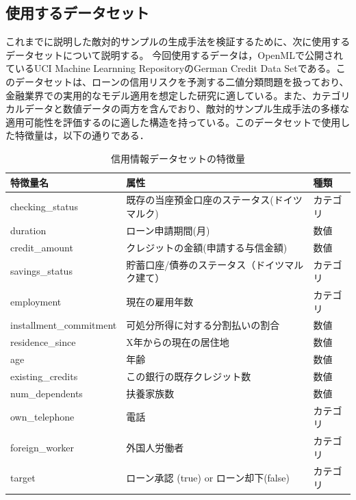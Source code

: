\subsection{使用するデータセット}
これまでに説明した敵対的サンプルの生成手法を検証するために、次に使用するデータセットについて説明する。
今回使用するデータは，OpenMLで公開されているUCI Machine Learnning RepositoryのGerman Credit Data Setである。\cite{credit-g}このデータセットは、ローンの信用リスクを予測する二値分類問題を扱っており、金融業界での実用的なモデル適用を想定した研究に適している。また、カテゴリカルデータと数値データの両方を含んでおり、敵対的サンプル生成手法の多様な適用可能性を評価するのに適した構造を持っている。このデータセットで使用した特徴量は，以下の通りである．

\begin{table}[H]
    \centering
    \caption{信用情報データセットの特徴量}
    \begin{tabular}{|l|l|l|}
        \hline
        特徴量名 & 属性 & 種類 \\ \hline
        checking\_status & 既存の当座預金口座のステータス(ドイツマルク) & カテゴリ \\ \hline
        duration & ローン申請期間(月) & 数値 \\ \hline
        credit\_amount & クレジットの金額(申請する与信金額) & 数値 \\ \hline
        savings\_status & 貯蓄口座/債券のステータス（ドイツマルク建て） & カテゴリ \\ \hline
        employment & 現在の雇用年数 & カテゴリ \\ \hline
        installment\_commitment & 可処分所得に対する分割払いの割合 & 数値 \\ \hline
        residence\_since & X年からの現在の居住地 & 数値 \\ \hline
        age & 年齢 & 数値 \\ \hline
        existing\_credits & この銀行の既存クレジット数 & 数値 \\ \hline
        num\_dependents & 扶養家族数 & 数値 \\ \hline
        own\_telephone & 電話 & カテゴリ \\ \hline
        foreign\_worker & 外国人労働者 & カテゴリ \\ \hline
        target & ローン承認 (true) or ローン却下(false) & カテゴリ \\ \hline
    \end{tabular}
    \label{tab:credit_g_features}
\end{table}


